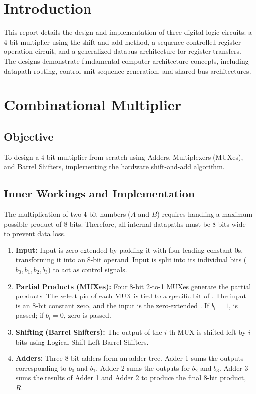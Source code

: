 \documentclass[12pt]{article}
\begin{document}
	
	\newpage
	\pagestyle{fancy}
	\fancyhf{}
	\cfoot{\thepage}
	

	\section{Introduction}
	This report details the design and implementation of three digital logic circuits: a 4-bit multiplier using the shift-and-add method, a sequence-controlled register operation circuit, and a generalized databus architecture for register transfers. The designs demonstrate fundamental computer architecture concepts, including datapath routing, control unit sequence generation, and shared bus architectures.
	
	\section{Combinational Multiplier }
	\subsection{Objective}
	To design a 4-bit multiplier from scratch using Adders, Multiplexers (MUXes), and Barrel Shifters, implementing the hardware shift-and-add algorithm.
	
	\subsection{Inner Workings and Implementation}
	The multiplication of two 4-bit numbers ($A$ and $B$) requires handling a maximum possible product of 8 bits. Therefore, all internal datapaths must be 8 bits wide to prevent data loss.
	
	\begin{enumerate}
		\item \textbf{Input:} Input  is zero-extended by padding it with four leading constant $0$s, transforming it into an 8-bit operand. Input  is split into its individual bits ($b_0, b_1, b_2, b_3$) to act as control signals.
		\item \textbf{Partial Products (MUXes):} Four 8-bit 2-to-1 MUXes generate the partial products. The select pin of each MUX is tied to a specific bit of . The  input is an 8-bit constant zero, and the  input is the zero-extended . If $b_i = 1$,  is passed; if $b_i = 0$, zero is passed.
		\item \textbf{Shifting (Barrel Shifters):} The output of the $i$-th MUX is shifted left by $i$ bits using Logical Shift Left Barrel Shifters.
		
		\item \textbf{Adders:} Three 8-bit adders form an adder tree. Adder 1 sums the outputs corresponding to $b_0$ and $b_1$. Adder 2 sums the outputs for $b_2$ and $b_3$. Adder 3 sums the results of Adder 1 and Adder 2 to produce the final 8-bit product, $R$.
	\end{enumerate}
	
\end{document}
